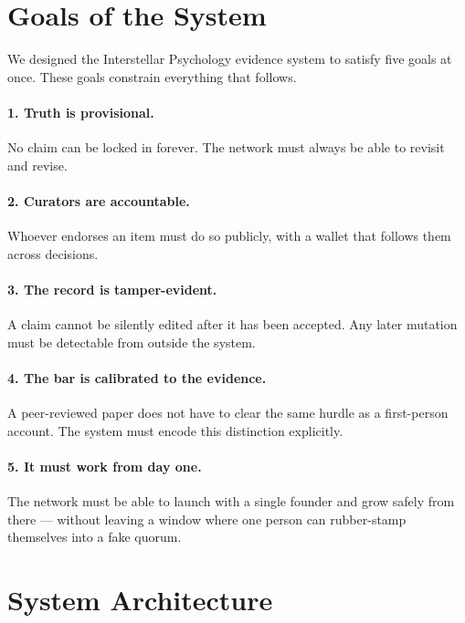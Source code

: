 \documentclass[11pt,a4paper]{article}
\begin{document}
\section{Goals of the System}

We designed the Interstellar Psychology evidence system to satisfy
five goals at once. These goals constrain everything that follows.

\paragraph{1. Truth is provisional.} No claim can be locked in
forever. The network must always be able to revisit and revise.

\paragraph{2. Curators are accountable.} Whoever endorses an item
must do so publicly, with a wallet that follows them across
decisions.

\paragraph{3. The record is tamper-evident.} A claim cannot be
silently edited after it has been accepted. Any later mutation must
be detectable from outside the system.

\paragraph{4. The bar is calibrated to the evidence.} A
peer-reviewed paper does not have to clear the same hurdle as a
first-person account. The system must encode this distinction
explicitly.

\paragraph{5. It must work from day one.} The network must be able
to launch with a single founder and grow safely from there ---
without leaving a window where one person can rubber-stamp
themselves into a fake quorum.

\section{System Architecture}
\end{document}
